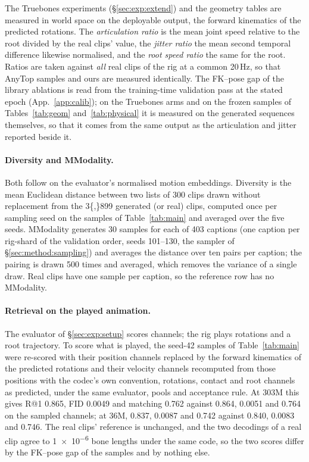 The Truebones experiments (\S\ref{sec:exp:extend}) and the geometry tables are measured in world space on
the deployable output, the forward kinematics of the predicted rotations. The \emph{articulation ratio} is the
mean joint speed relative to the root divided by the real clips' value, the \emph{jitter ratio} the mean second
temporal difference likewise normalised, and the \emph{root speed ratio} the same for the root. Ratios are taken
against \emph{all} real clips of the rig at a common 20\,Hz, so that AnyTop samples and ours are measured
identically. The FK--pose gap of the library ablations is read from the training-time validation pass at the
stated epoch (App.~\ref{app:calib}); on the Truebones arms and on the frozen samples of Tables~\ref{tab:geom}
and~\ref{tab:physical} it is measured on the generated sequences themselves, so that it comes from the same
output as the articulation and jitter reported beside it.

\paragraph{Diversity and MModality.} Both follow \citet{guo2022generating} on the evaluator's normalised motion
embeddings. Diversity is the mean Euclidean distance between two lists of 300 clips drawn without replacement from
the \num{3{,}899} generated (or real) clips, computed once per sampling seed on the samples of Table~\ref{tab:main}
and averaged over the five seeds. MModality generates 30 samples for each of \num{403} captions (one caption per
rig-shard of the validation order, seeds 101--130, the sampler of \S\ref{sec:method:sampling}) and averages the
distance over ten pairs per caption; the pairing is drawn 500 times and averaged, which removes the variance of a
single draw. Real clips have one sample per caption, so the reference row has no MModality.

\paragraph{Retrieval on the played animation.} The evaluator of \S\ref{sec:exp:setup} scores \rep{} channels; the
rig plays rotations and a root trajectory. To score what is played, the seed-42 samples of Table~\ref{tab:main}
were re-scored with their position channels replaced by the forward kinematics of the predicted rotations and
their velocity channels recomputed from those positions with the codec's own convention, rotations, contact and
root channels as predicted, under the same evaluator, pools and acceptance rule. At \num{303}M this gives R@1
\num{0.865}, FID \num{0.0049} and matching \num{0.762} against \num{0.864}, \num{0.0051} and \num{0.764} on the
sampled channels; at \num{36}M, \num{0.837}, \num{0.0087} and \num{0.742} against \num{0.840}, \num{0.0083} and
\num{0.746}. The real clips' reference is unchanged, and the two decodings of a real clip agree to \num{1e-6} bone
lengths under the same code, so the two scores differ by the FK--pose gap of the samples and by nothing else.

